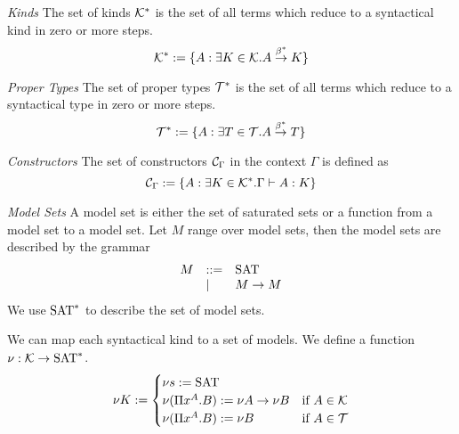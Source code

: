 \begin{definition}
    \emph{Kinds}
    The set of kinds ${\cal K}^*$ is the set of all terms which
    reduce to a syntactical kind in zero or more steps.
    $$
    {\cal K}^* := {\{A: \exists K \in {\cal K}. A \stackrel{\beta^*}{\to} K\}}
    $$
\end{definition}





\begin{definition}
    \emph{Proper Types}
    The set of proper types ${\cal T}^*$ is the set of all
    terms which reduce to a syntactical type in zero or more steps.
    $$
    {\cal T}^* := {\{A: \exists T \in {\cal T}. A \stackrel{\beta^*}{\to} T\}}
    $$
\end{definition}





\begin{definition}
    \emph{Constructors}
    The set of constructors ${\cal C}_\Gamma$ in the
    context $\Gamma$ is defined as
    $$
    {\cal C}_\Gamma := {\{A: \exists K\in{\cal K}^*. \Gamma \vdash A: K\}}
    $$
\end{definition}




\begin{definition}
    \emph{Model Sets} A model set is either the set of saturated sets or a
    function from a model set to a model set. Let $M$ range over model sets,
    then the model sets are described by the grammar
    $$
    \begin{array}{lll}
        M &::=& \text{SAT}
        \\
        &\mid& M \to M
    \end{array}
    $$
    We use $\text{SAT}^*$ to describe the set of model sets.

    We can map each syntactical kind to a set of models. We
    define a function $\nu: \skinds \to \satsets^*$.
    $$
    \nu K :=
    \begin{cases}
        \nu s := \satsets
        \\

        \nu (\Pi x^A. B) := \nu A \to \nu B & \mbox{if } A \in \skinds
        \\
        \nu (\Pi x^A. B) := \nu B & \mbox{if } A \in \stypes
    \end{cases}
    $$
\end{definition}

